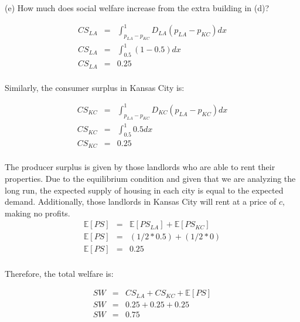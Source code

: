 \begin{tcolorbox}
    (e) How much does social welfare increase from the extra building in (d)?
\end{tcolorbox}

\begin{eqnarray*}
    CS_{LA} &=& \int_{p_{LA} - p_{KC}}^{1}  D_{LA}(p_{LA} - p_{KC}) dx\\
    CS_{LA} &=& \int_{0.5}^{1}  (1 - 0.5)dx\\
    CS_{LA} &=& 0.25\\
\end{eqnarray*}

Similarly, the consumer surplus in Kansas City is:

\begin{eqnarray*}
    CS_{KC} &=& \int_{p_{LA} - p_{KC}}^{1}  D_{KC}(p_{LA} - p_{KC}) dx\\
    CS_{KC} &=& \int_{0.5}^{1}  0.5dx\\
    CS_{KC} &=& 0.25\\
\end{eqnarray*}

The producer surplus is given by those landlords who are able to rent their properties. Due to the equilibrium condition and given that we are analyzing the long run, the expected supply of housing in each city is equal to the expected demand. Additionally, those landlords in Kansas City will rent at a price of \( c \), making no profits.\\

\begin{eqnarray*}
    \mathbb{E}[PS] &=& \mathbb{E}[PS_{LA}] + \mathbb{E}[PS_{KC}]\\
    \mathbb{E}[PS] &=& (1/2*0.5) + (1/2 * 0)\\
    \mathbb{E}[PS] &=& 0.25\\
\end{eqnarray*}

Therefore, the total welfare is:

\begin{eqnarray*}
    SW &=& CS_{LA} + CS_{KC} + \mathbb{E}[PS]\\
    SW &=& 0.25 + 0.25 + 0.25\\
    SW &=& 0.75\\
\end{eqnarray*}

